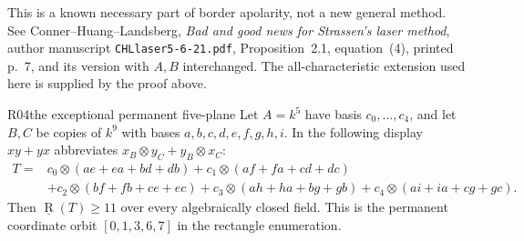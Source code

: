 This is a known necessary part of border apolarity, not a new
general method. See Conner--Huang--Landsberg,
\emph{Bad and good news for Strassen's laser method},
author manuscript \texttt{CHLlaser5-6-21.pdf}, Proposition~2.1,
equation~(4), printed p.~7, and its version with $A,B$ interchanged.
The all-characteristic extension used here is supplied by the proof above.

\begin{finding}{R04}{the exceptional permanent five-plane}
Let $A=k^5$ have basis $c_0,\ldots,c_4$, and let $B,C$ be
copies of $k^9$ with bases $a,b,c,d,e,f,g,h,i$. In the following
display $xy+yx$ abbreviates $x_B\otimes y_C+y_B\otimes x_C$:
\begin{align*}
 T={}&c_0\otimes(ae+ea+bd+db)
     +c_1\otimes(af+fa+cd+dc)\\
   &+c_2\otimes(bf+fb+ce+ec)
     +c_3\otimes(ah+ha+bg+gb)
     +c_4\otimes(ai+ia+cg+gc).
\end{align*}
Then $\underline{\operatorname R}(T)\geq11$ over every
algebraically closed field. This is the permanent coordinate
orbit $[0,1,3,6,7]$ in the rectangle enumeration.
\end{finding}

